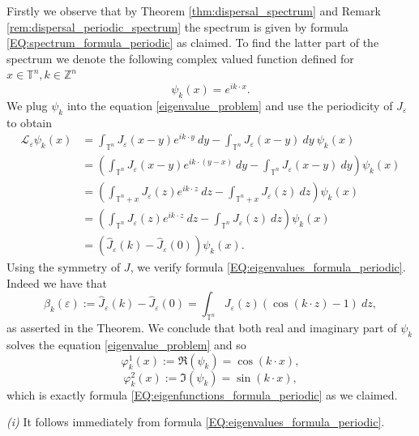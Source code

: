 \documentclass[12pt, a4paper]{article}
\theoremstyle{break}
\theoremstyle{break}
\theoremstyle{break}
\theoremstyle{break}
\theoremstyle{break}
\newcommand{\Leo}{\mathcal{L}_{\varepsilon}}
\begin{document}
Firstly we observe that by Theorem \ref{thm:dispersal_spectrum} and Remark \ref{rem:dispersal_periodic_spectrum} the spectrum is given by formula \eqref{EQ:spectrum_formula_periodic} as claimed. To find the latter part of the spectrum we denote the following complex valued function defined for $x \in \mathbb{T}^n, k \in \mathbb{Z}^n$
\begin{equation*}
    \psi_k(x) = e^{ik\cdot x}.
\end{equation*}
We plug $\psi_k$ into the equation \eqref{eigenvalue_problem} and use the periodicity of $J_\varepsilon$ to obtain
\begin{align*}
    \Leo \psi_k(x) &= \int_{\mathbb{T}^n} J_\varepsilon(x-y) e^{ik\cdot y}\:dy - \int_{\mathbb{T}^n} J_\varepsilon(x-y)\:dy\: \psi_k(x) \\
    &= \left(\int_{\mathbb{T}^n} J_\varepsilon(x-y) e^{ik\cdot (y-x)}\:dy - \int_{\mathbb{T}^n} J_\varepsilon(x-y)\:dy\right) \psi_k(x) \\
    &= \left(\int_{\mathbb{T}^n + x} J_\varepsilon(z) e^{ik\cdot z}\:dz - \int_{\mathbb{T}^n + x} J_\varepsilon(z)\:dz\right) \psi_k(x) \\
    &= \left( \int_{\mathbb{T}^n} J_\varepsilon(z) e^{ik\cdot z}\:dz - \int_{\mathbb{T}^n} J_\varepsilon(z)\:dz\right) \psi_k(x) \\
    &= \left(\hat{J}_\varepsilon(k) - \hat{J}_\varepsilon(0)\right) \psi_k(x).
\end{align*}
Using the symmetry of $J$, we verify formula \eqref{EQ:eigenvalues_formula_periodic}. Indeed we have that
\begin{equation*}
    \beta_k(\varepsilon) := \hat{J}_\varepsilon(k) - \hat{J}_\varepsilon(0) = \int_{\mathbb{T}^n} J_\varepsilon(z) (\cos(k\cdot z) - 1)\:dz,
\end{equation*}
as asserted in the Theorem. We conclude that both real and imaginary part of $\psi_k$ solves the equation \eqref{eigenvalue_problem} and so
$$\varphi_k^1(x) := \Re(\psi_k) = \cos(k \cdot x),$$
$$\varphi_k^2(x) := \Im(\psi_k) = \sin(k \cdot x),$$
which is exactly formula \eqref{EQ:eigenfunctions_formula_periodic} as we claimed.

\textit{(i)} It follows immediately from formula \eqref{EQ:eigenvalues_formula_periodic}.
\end{document}
